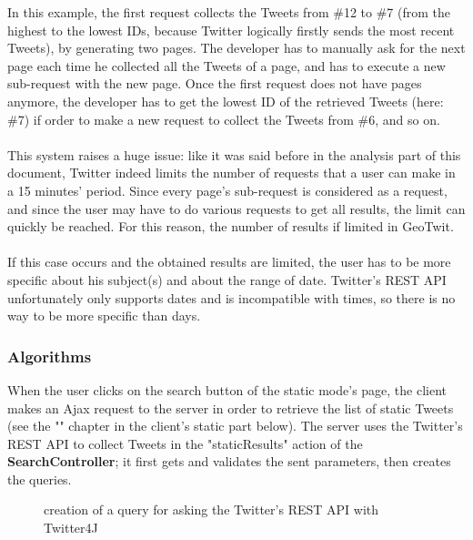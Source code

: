 \documentclass[a4paper,11pt]{report}
\begin{document}
In this example, the first request collects the Tweets from \#12 to \#7 (from the highest to the lowest IDs, because Twitter logically firstly sends the most recent Tweets), by generating two pages. The developer has to manually ask for the next page each time he collected all the Tweets of a page, and has to execute a new sub-request with the new page. Once the first request does not have pages anymore, the developer has to get the lowest ID of the retrieved Tweets (here: \#7) if order to make a new request to collect the Tweets from \#6, and so on.\\\\
This system raises a huge issue: like it was said before in the analysis part of this document, Twitter indeed limits the number of requests that a user can make in a 15 minutes' period. Since every page's sub-request is considered as a request, and since the user may have to do various requests to get all results, the limit can quickly be reached. For this reason, the number of results if limited in GeoTwit.\\\\
If this case occurs and the obtained results are limited, the user has to be more specific about his subject(s) and about the range of date. Twitter's REST API unfortunately only supports dates and is incompatible with times, so there is no way to be more specific than days.

\subsubsection{Algorithms}
When the user clicks on the search button of the static mode's page, the client makes an Ajax request to the server in order to retrieve the list of static Tweets (see the "" chapter in the client's static part below). The server uses the Twitter's REST API to collect Tweets in the "staticResults" action of the \textbf{SearchController}; it first gets and validates the sent parameters, then creates the queries.
\begin{figure}[H]
\vspace{-5pt}
\begin{center}
\vspace{-5pt}
\caption{creation of a query for asking the Twitter's REST API with Twitter4J}
\end{center}
\end{figure}
\end{document}
